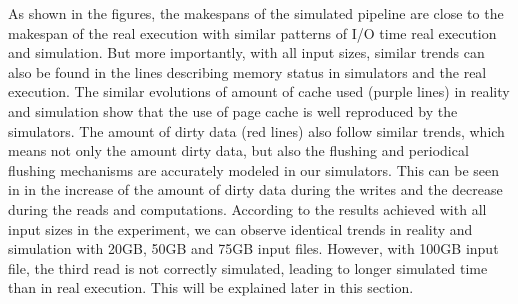 \documentclass[conference]{IEEEtran}
\begin{document}
            As shown in the figures, the makespans of the simulated pipeline are
            close to the makespan of the real execution with similar patterns of I/O time
            real execution and simulation.
            But more importantly, with all input sizes, similar trends can also be found
            in the lines describing memory status in simulators and the real execution.
            The similar evolutions of amount of cache used (purple lines) in reality
            and simulation show that the use of page cache is well reproduced by the simulators.
            The amount of dirty data (red lines) also follow similar trends,
            which means not only the amount dirty data, but also the flushing and
            periodical flushing mechanisms are accurately modeled in our simulators.
            This can be seen in in the increase of the amount of dirty data during the writes
            and the decrease during the reads and computations.
            According to the results achieved with all input sizes in the experiment,
            we can observe identical trends in reality and simulation with 20GB,
            50GB and 75GB input files. However, with 100GB input file,
            the third read is not correctly simulated, leading to longer simulated time
            than in real execution. This will be explained later in this section.
\end{document}
